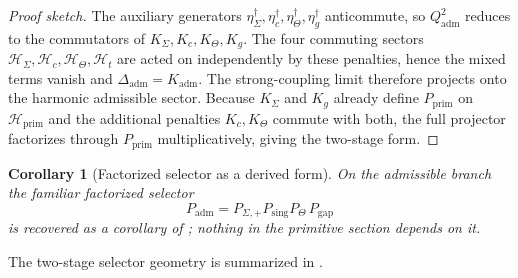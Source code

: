 \documentclass[11pt,a4paper]{article}
\newtheorem{corollary}[theorem]{Corollary}
\theoremstyle{definition}
\theoremstyle{remark}
\newcommand{\Seam}{\Sigma}
\newcommand{\Kadm}{K_{\mathrm{adm}}}
\newcommand{\Padm}{P_{\mathrm{adm}}}
\newcommand{\Pprim}{P_{\mathrm{prim}}}
\begin{document}
\begin{proof}[Proof sketch]
The auxiliary generators $\eta_\Sigma^\dagger,\eta_c^\dagger,\eta_\Theta^\dagger,\eta_g^\dagger$
anticommute, so $Q_{\mathrm{adm}}^2$ reduces to the commutators of $K_\Sigma,K_c,K_\Theta,K_g$.
The four commuting sectors $\mathcal H_\Seam,\mathcal H_c,\mathcal H_\Theta,\mathcal H_t$ are
acted on independently by these penalties, hence the mixed terms vanish and $\Delta_{\mathrm{adm}}=\Kadm$. The strong-coupling limit therefore projects onto the harmonic
admissible sector. Because $K_\Sigma$ and $K_g$ already define $\Pprim$ on
$\mathcal H_{\mathrm{prim}}$ and the additional penalties $K_c,K_\Theta$ commute with both, the
full projector factorizes through $\Pprim$ multiplicatively, giving the two-stage form.
\end{proof}

\begin{corollary}[Factorized selector as a derived form]
\label{cor:factorized-admissibility-selector}
On the admissible branch the familiar factorized selector
\[
\Padm=P_{\Seam,+}P_{\mathrm{sing}}P_\Theta\,P_{\mathrm{gap}}
\]
is recovered as a corollary of ; nothing in the primitive section depends
on it.
\end{corollary}

The two-stage selector geometry is summarized in .
\end{document}
